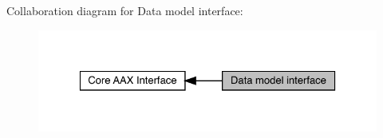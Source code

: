 Collaboration diagram for Data model interface\+:
\nopagebreak
\begin{figure}[H]
\begin{center}
\leavevmode
\includegraphics[width=326pt]{a00798}
\end{center}
\end{figure}
